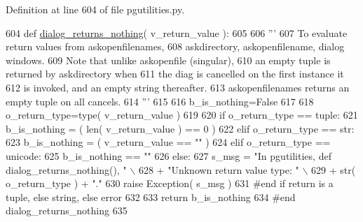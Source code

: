 Definition at line 604 of file pgutilities.\+py.


\begin{DoxyCode}
604 \textcolor{keyword}{def }\hyperlink{namespacenegui_1_1pgutilities_aa839d4997d2bd2c15016c33cc7fce3b0}{dialog\_returns\_nothing}( v\_return\_value ):
605 
606     \textcolor{stringliteral}{'''}
607 \textcolor{stringliteral}{    To evaluate return values from askopenfilenames,}
608 \textcolor{stringliteral}{    askdirectory, askopenfilename, dialog windows.}
609 \textcolor{stringliteral}{    Note that unlike askopenfile (singular),}
610 \textcolor{stringliteral}{    an empty tuple is returned by askdirectory when}
611 \textcolor{stringliteral}{    the diag is cancelled on the first instance it}
612 \textcolor{stringliteral}{    is invoked, and an empty string thereafter.  }
613 \textcolor{stringliteral}{    askopenfilenames returns an empty tuple on all cancels.}
614 \textcolor{stringliteral}{    '''} 
615 
616     b\_is\_nothing=\textcolor{keyword}{False}
617 
618     o\_return\_type=type( v\_return\_value )
619 
620     \textcolor{keywordflow}{if} o\_return\_type == tuple:
621         b\_is\_nothing = ( len( v\_return\_value ) == 0 )
622     \textcolor{keywordflow}{elif} o\_return\_type == str:
623         b\_is\_nothing = ( v\_return\_value == \textcolor{stringliteral}{""} )
624     \textcolor{keywordflow}{elif} o\_return\_type == unicode:
625         b\_is\_nothing == \textcolor{stringliteral}{""}
626     \textcolor{keywordflow}{else}:
627         s\_msg = \textcolor{stringliteral}{"In pgutilities, def dialog\_returns\_nothing(), "} \(\backslash\)
628                 + \textcolor{stringliteral}{"Unknown return value type: "} \(\backslash\)
629                 + str( o\_return\_type ) + \textcolor{stringliteral}{"."}
630         \textcolor{keywordflow}{raise} Exception( s\_msg )
631     \textcolor{comment}{#end if return is a tuple, else string, else error}
632 
633     \textcolor{keywordflow}{return} b\_is\_nothing 
634 \textcolor{comment}{#end dialog\_returns\_nothing}
635 
\end{DoxyCode}
